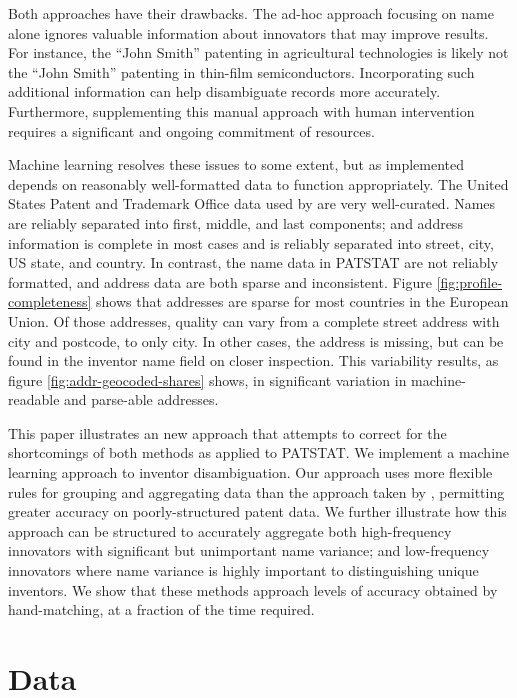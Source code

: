 \documentclass[11pt]{article}
\begin{document}
Both approaches have their drawbacks. The ad-hoc approach focusing on
name alone ignores valuable information about innovators that may
improve results. For instance, the ``John Smith'' patenting in
agricultural technologies is likely not the ``John Smith'' patenting
in thin-film semiconductors. Incorporating such additional information
can help disambiguate records more accurately. Furthermore, supplementing this manual
approach with human intervention requires a significant and ongoing
commitment of resources. 

Machine learning resolves these issues to
some extent, but as implemented depends on reasonably well-formatted
data to function
appropriately. The United States Patent and Trademark Office data used by
\citeauthor{lai2011disambiguation} are very well-curated. Names
are reliably separated into first, middle, and last components;
and address information is complete in most cases and is reliably
separated into street, city, US state, and country. In contrast, the
name data in PATSTAT are not reliably formatted, and address data are
both sparse and inconsistent. Figure \ref{fig:profile-completeness}
shows that addresses are sparse for most countries in the European Union. Of those
addresses, quality can vary from a complete street address with city
and postcode, to only city. In other cases, the address is missing,
but can be found in the inventor name field on closer inspection. This
variability results, as figure \ref{fig:addr-geocoded-shares} shows,
in significant variation in machine-readable and parse-able addresses.

This paper illustrates an new approach that attempts to correct for
the shortcomings of both methods as applied to PATSTAT. We implement a
machine learning approach to inventor disambiguation. Our approach
uses more flexible rules for grouping and aggregating data than the
approach taken by \cite{lai2011disambiguation}, permitting greater
accuracy on poorly-structured patent data. We further illustrate how
this approach can be structured to accurately aggregate both
high-frequency innovators with significant but unimportant name
variance; and low-frequency innovators where name variance is highly
important to distinguishing unique inventors. We show that these
methods approach levels of accuracy obtained by hand-matching, at a
fraction of the time required.

\section{Data}
\label{sec:data}
\end{document}
